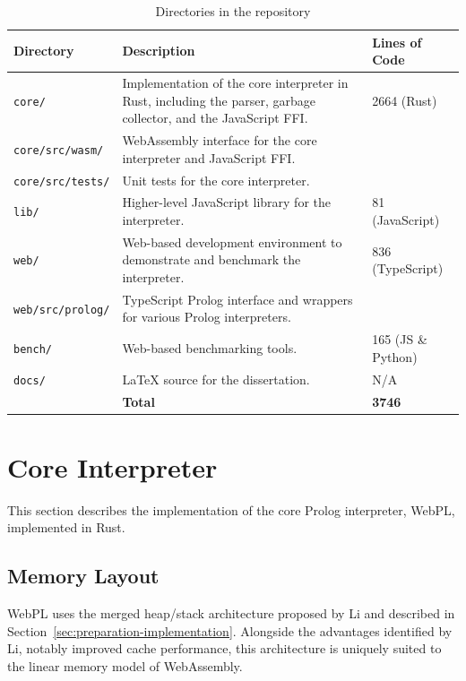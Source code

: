 \begin{table}[H]
\centering
\begin{tabular}{lp{9cm}l}
\hline
\textbf{Directory} & \textbf{Description} & \textbf{Lines of Code} \\
\hline
\texttt{core/} & Implementation of the core interpreter in Rust, including the parser, garbage collector, and the JavaScript FFI. & 2664 (Rust) \\
\texttt{core/src/wasm/} & WebAssembly interface for the core interpreter and JavaScript FFI. & \\
\texttt{core/src/tests/} & Unit tests for the core interpreter. & \\
\texttt{lib/} & Higher-level JavaScript library for the interpreter. & 81 (JavaScript) \\
\texttt{web/} & Web-based development environment to demonstrate and benchmark the interpreter. & 836 (TypeScript) \\
\texttt{web/src/prolog/} & TypeScript Prolog interface and wrappers for various Prolog interpreters. & \\
\texttt{bench/} & Web-based benchmarking tools. & 165 (JS \& Python) \\
\texttt{docs/} & LaTeX source for the dissertation. & N/A \\
\hline
& \hfill \textbf{Total} & \textbf{3746} \\
\hline
\end{tabular}
\caption{Directories in the repository}
\label{tab:repository-overview}
\end{table}

\section{Core Interpreter}

\label{sec:core-interpreter}

This section describes the implementation of the core Prolog interpreter, WebPL, implemented in Rust.

\subsection{Memory Layout}

\label{sec:memory-layout}

WebPL uses the merged heap/stack architecture proposed by Li \cite{liEfficientMemoryManagement2000} and described in Section~\ref{sec:preparation-implementation}. Alongside the advantages identified by Li, notably improved cache performance, this architecture is uniquely suited to the linear memory model of WebAssembly.

